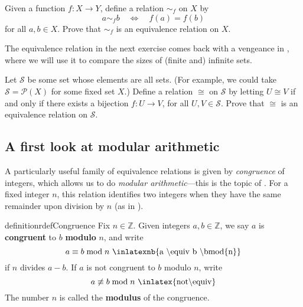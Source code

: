 \begin{exercise}
\label{exEquivalenceRelationFromFunction}
Given a function $f : X \to Y$, define a relation $\sim_f$ on $X$ by
\[ a \sim_f b \quad \Leftrightarrow \quad f(a) = f(b) \]
for all $a,b \in X$. Prove that $\sim_f$ is an equivalence relation on $X$.
\end{exercise}

The equivalence relation in the next exercise comes back with a vengeance in , where we will use it to compare the sizes of (finite and) infinite sets.

\begin{exercise}
\label{exBijectionIsEquivalenceRelation}
Let $\mathcal{S}$ be some set whose elements are all sets. (For example, we could take $\mathcal{S} = \mathcal{P}(X)$ for some fixed set $X$.) Define a relation $\cong$  on $\mathcal{S}$ by letting $U \cong V$ if and only if there exists a bijection $f : U \to V$, for all $U,V \in \mathcal{S}$. Prove that $\cong$ is an equivalence relation on $\mathcal{S}$.
\end{exercise}

\subsection*{A first look at modular arithmetic}

A particularly useful family of equivalence relations is given by \textit{congruence} of integers, which allows us to do \textit{modular arithmetic}---this is the topic of . For a fixed integer $n$, this relation identifies two integers when they have the same remainder upon division by $n$ (as in ).

\begin{restatable}{definition}{rdefCongruence}
\label{defCongruence}
Fix $n \in \mathbb{Z}$. Given integers $a,b \in \mathbb{Z}$, we say $a$ is \textbf{congruent} to $b$ \textbf{modulo} $n$, and write
\[ a \equiv b \bmod{n} \text{ \inlatexnb{a \textbackslash{}equiv b \textbackslash{}bmod\{n\}}} \]
if $n$ divides $a-b$. If $a$ is not congruent to $b$ modulo $n$, write
\[ a \not \equiv b \bmod n \text{ \inlatex{not\textbackslash{}equiv}} \]
The number $n$ is called the \textbf{modulus} of the congruence.
\end{restatable}

